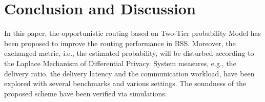\section{Conclusion and Discussion}
\label{sec:conclusion}
In this paper, the opportunistic routing based on Two-Tier probability Model
has been proposed to improve the routing performance in BSS.
Moreover, the exchanged metric, i.e., the estimated probability,
will be disturbed according to the Laplace Mechanism of Differential Privacy.
System measures, e.g., the delivery ratio, the delivery latency 
and the communication workload,
have been explored with several benchmarks and various settings.
The soundness of the proposed scheme have been verified via simulations.
